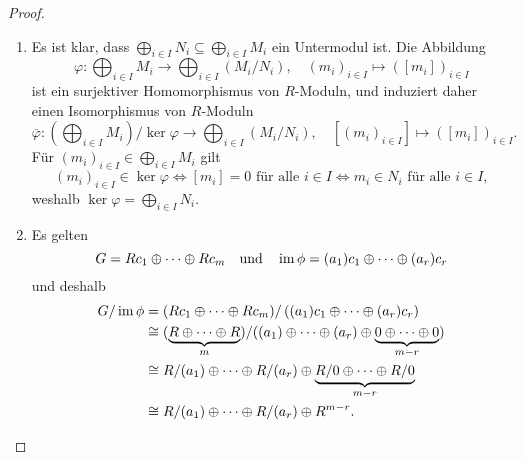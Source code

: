 \documentclass[a4paper,10pt,numbers=noenddot]{scrartcl}
\begin{document}
\begin{proof}
  \begin{enumerate}
    \item
      Es ist klar, dass $\bigoplus_{i \in I} N_i \subseteq \bigoplus_{i \in I} M_i$ ein Untermodul ist.
      Die Abbildung
      \[
                \varphi
        \colon  \bigoplus_{i \in I} M_i \to \bigoplus_{i \in I} (M_i / N_i),
        \quad
                (m_i)_{i \in I} \mapsto ([m_i])_{i \in I}
      \]
      ist ein surjektiver Homomorphismus von $R$-Moduln, und induziert daher einen Isomorphismus von $R$-Moduln
      \[
                \overline{\varphi}
        \colon  \left( \bigoplus_{i \in I} M_i \right) / \ker \varphi \to \bigoplus_{i \in I} (M_i / N_i),
        \quad
                [(m_i)_{i \in I}] \mapsto ([m_i])_{i \in I}.
      \]
      Für $(m_i)_{i \in I} \in \bigoplus_{i \in I} M_i$ gilt
      \[
              (m_i)_{i \in I} \in \ker \varphi
        \iff  \text{$[m_i] = 0$ für alle $i \in I$}
        \iff  \text{$m_i \in N_i$ für alle $i \in I$},
      \]
      weshalb $\ker \varphi = \bigoplus_{i \in I} N_i$.
    \item
      Es gelten
      \[
          G
        = R c_1 \oplus \dotsb \oplus R c_m
      \quad\text{und}\quad
          \operatorname{im} \phi
        = (a_1) c_1 \oplus \dotsb \oplus (a_r) c_r
      \]
      und deshalb
      \begin{align*}
                G / \operatorname{im} \phi
        &=      (R c_1 \oplus \dotsb \oplus R c_m) / \left( (a_1) c_1 \oplus \dotsb \oplus (a_r) c_r \right)
        \\
        &\cong  ( \underbrace{R \oplus \dotsb \oplus R}_{m} )
                / ( (a_1) \oplus \dotsb \oplus (a_r) \oplus \underbrace{0 \oplus \dotsb \oplus 0}_{m-r} )
        \\
        &\cong  R/(a_1) \oplus \dotsb \oplus R/(a_r) \oplus \underbrace{R/0 \oplus \dotsb \oplus R/0}_{m-r}
        \\
        &\cong  R/(a_1) \oplus \dotsb \oplus R/(a_r) \oplus R^{m-r}.
      \qedhere
      \end{align*}
  \end{enumerate}
\end{proof}
\end{document}
